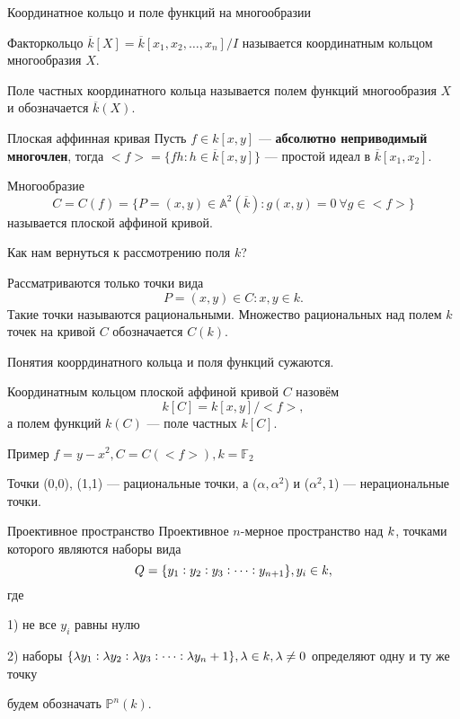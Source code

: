 \documentclass{beamer}
\begin{document}
\begin {frame}  {Координатное кольцо и поле функций на многообразии}
 \begin {block}

Факторкольцо ${\overline k}[X] = {\overline k}[x_1, x_2, \dots, x_n] / I$ называется координатным кольцом многообразия $X$.
\newline

Поле частных координатного кольца называется полем функций многообразия $X$ и обозначается  ${\overline k}(X)$.
 \end {block}
\end {frame}

\begin {frame}  {Плоская аффинная кривая}
Пусть $f \in k[x,y]$ --- {\bf абсолютно неприводимый многочлен}, тогда $<f> = \{fh : h \in {\overline k}[x,y] \}$ --- простой идеал в  ${\overline k}[x_1, x_2].$
\newline

Многообразие $$C = C(f) = \{ P = (x, y) \in {\mathbb A^2}({\overline k}) : g(x,y) = 0 \  \forall  g \in <f> \}$$ называется плоской аффиной кривой.
\newline

Как нам вернуться к рассмотрению поля $k$?
\end {frame}

\begin {frame}
Рассматриваются только точки вида $$ P = (x, y) \in C : x, y \in k. $$
Такие точки называются рациональными.
Множество рациональных над полем $k$ точек на кривой $C$ обозначается $C(k)$.
\newline

Понятия кооррдинатного кольца и поля функций сужаются.

Координатным кольцом плоской аффиной кривой $C$ назовём  $$k[C] = k[x,y]/<f>,$$ а полем функций $k(C)$ --- поле частных $k[C]$.

\end {frame}

\begin {frame} {Пример}
$f = y - x^2, C = C(<f>), k = {\mathbb F}_2$

Точки (0,0), (1,1) --- рациональные точки, а ($\alpha, \alpha^2$) и ($\alpha^2, 1$) --- нерациональные точки.
\end{frame}

\begin {frame}  {Проективное пространство}
Проективное $n$-мерное пространство над ${\sl k}$, точками которого являются наборы вида $$Q = \{y_1 : y_2 : y_3 : \dots : y_{n+1}\} , y_i \in {\sl k},$$ где
\newline

1) не все $y_i$ равны нулю

2) наборы $ \{\lambda y_1 : \lambda y_2 : \lambda y_3 : \dots : \lambda y_n+1 \}, \lambda \in {\sl k}, \lambda \ne 0$ определяют одну и ту же точку
\newline

 будем обозначать ${\mathbb P^n}(k)$.
\end{frame}
\end{document}
